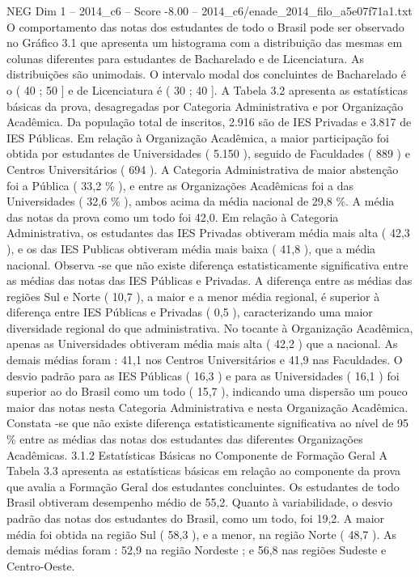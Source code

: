 \begin{textsample}{NEG Dim 1 – 2014\_c6 – Score -8.00 – 2014\_c6/enade\_2014\_filo\_a5e07f71a1.txt}
O comportamento das notas dos estudantes de todo o Brasil pode ser observado no Gráfico 3.1 que apresenta um histograma com a distribuição das mesmas em colunas diferentes para estudantes de Bacharelado e de Licenciatura.
As distribuições são unimodais.
O intervalo modal dos concluintes de Bacharelado é o ( 40 ; 50 ] e de Licenciatura é ( 30 ; 40 ].
A Tabela 3.2 apresenta as estatísticas básicas da prova, desagregadas por Categoria Administrativa e por Organização Acadêmica.
Da população total de inscritos, 2.916 são de IES Privadas e 3.817 de IES Públicas.
Em relação à Organização Acadêmica, a maior participação foi obtida por estudantes de Universidades ( 5.150 ), seguido de Faculdades ( 889 ) e Centros Universitários ( 694 ).
A Categoria Administrativa de maior abstenção foi a Pública ( 33,2 \% ), e entre as Organizações Acadêmicas foi a das Universidades ( 32,6 \% ), ambos acima da média nacional de 29,8 \%.
A média das notas da prova como um todo foi 42,0.
Em relação à Categoria Administrativa, os estudantes das IES Privadas obtiveram média mais alta ( 42,3 ), e os das IES Publicas obtiveram média mais baixa ( 41,8 ), que a média nacional.
Observa -se que não existe diferença estatisticamente significativa entre as médias das notas das IES Públicas e Privadas.
A diferença entre as médias das regiões Sul e Norte ( 10,7 ), a maior e a menor média regional, é superior à diferença entre IES Públicas e Privadas ( 0,5 ), caracterizando uma maior diversidade regional do que administrativa.
No tocante à Organização Acadêmica, apenas as Universidades obtiveram média mais alta ( 42,2 ) que a nacional.
As demais médias foram : 41,1 nos Centros Universitários e 41,9 nas Faculdades.
O desvio padrão para as IES Públicas ( 16,3 ) e para as Universidades ( 16,1 ) foi superior ao do Brasil como um todo ( 15,7 ), indicando uma dispersão um pouco maior das notas nesta Categoria Administrativa e nesta Organização Acadêmica.
Constata -se que não existe diferença estatisticamente significativa ao nível de 95 \% entre as médias das notas dos estudantes das diferentes Organizações Acadêmicas. 3.1.2 Estatísticas Básicas no Componente de Formação Geral A Tabela 3.3 apresenta as estatísticas básicas em relação ao componente da prova que avalia a Formação Geral dos estudantes concluintes.
Os estudantes de todo Brasil obtiveram desempenho médio de 55,2.
Quanto à variabilidade, o desvio padrão das notas dos estudantes do Brasil, como um todo, foi 19,2.
A maior média foi obtida na região Sul ( 58,3 ), e a menor, na região Norte ( 48,7 ).
As demais médias foram : 52,9 na região Nordeste ; e 56,8 nas regiões Sudeste e Centro-Oeste.

\end{textsample}
